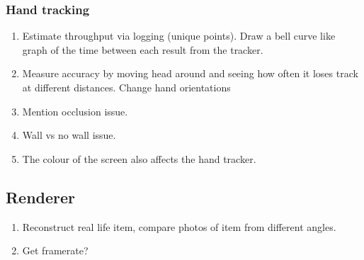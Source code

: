 \subsubsection{Hand tracking}
\begin{enumerate}
	\item Estimate throughput via logging (unique points). Draw a bell curve like graph of the time between each result from the tracker.
	\item Measure accuracy by moving head around and seeing how often it loses track at different distances. Change hand orientations
	\item Mention occlusion issue. 
	\item Wall vs no wall issue. 
	\item The colour of the screen also affects the hand tracker. 
\end{enumerate}

\subsection{Renderer}
\begin{enumerate}
	\item Reconstruct real life item, compare photos of item from different angles. 
	\item Get framerate?
\end{enumerate}